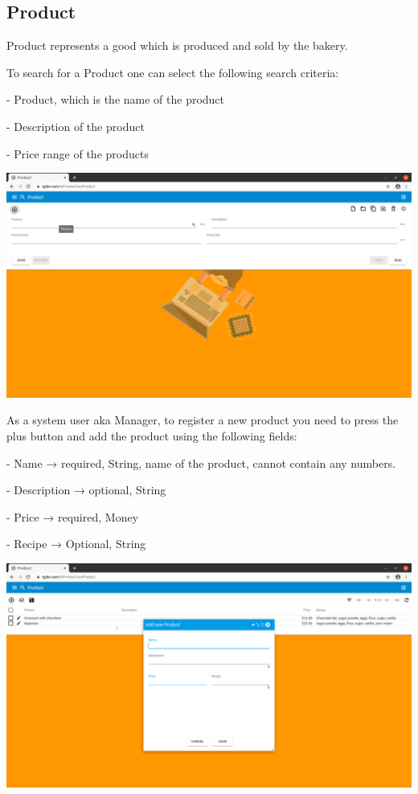 \subsection{Product}

Product represents a good which is produced and sold by the bakery.

To search for a Product one can select the following search criteria:

- Product, which is the name of the product

- Description of the product

- Price range of the products

\includegraphics[width=\textwidth]{sections/01-chapter/images/product11.png}

As a system user aka Manager, to register a new product you need to press the plus button and add the product using the following fields:

- Name → required, String, name of the product, cannot contain any numbers.

- Description → optional, String

- Price → required, Money

- Recipe → Optional, String

\includegraphics[width=\textwidth]{sections/01-chapter/images/product12.png}

